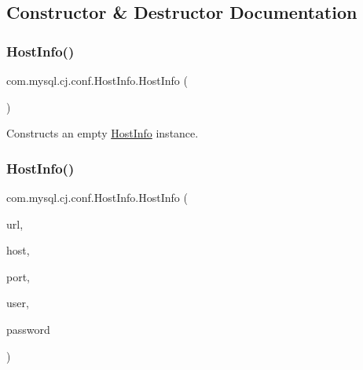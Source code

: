 \subsection{Constructor \& Destructor Documentation}
\mbox{\label{classcom_1_1mysql_1_1cj_1_1conf_1_1_host_info_a4560d8ddc8f66b75d4285b0bb1e3a2c0}} 
\subsubsection{\texorpdfstring{Host\+Info()}{HostInfo()}\hspace{0.1cm}{\footnotesize\ttfamily [1/4]}}
{\footnotesize\ttfamily com.\+mysql.\+cj.\+conf.\+Host\+Info.\+Host\+Info (\begin{DoxyParamCaption}{ }\end{DoxyParamCaption})}

Constructs an empty \mbox{\hyperlink{classcom_1_1mysql_1_1cj_1_1conf_1_1_host_info}{Host\+Info}} instance. \mbox{\label{classcom_1_1mysql_1_1cj_1_1conf_1_1_host_info_abf279f3212ad1fe272189757ef090d90}} 
\subsubsection{\texorpdfstring{Host\+Info()}{HostInfo()}\hspace{0.1cm}{\footnotesize\ttfamily [2/4]}}
{\footnotesize\ttfamily com.\+mysql.\+cj.\+conf.\+Host\+Info.\+Host\+Info (\begin{DoxyParamCaption}\item[{\mbox{\hyperlink{interfacecom_1_1mysql_1_1cj_1_1conf_1_1_database_url_container}{Database\+Url\+Container}}}]{url,  }\item[{String}]{host,  }\item[{int}]{port,  }\item[{String}]{user,  }\item[{String}]{password }\end{DoxyParamCaption})}

